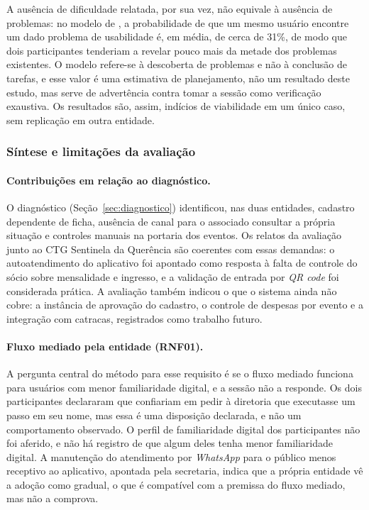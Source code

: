 \documentclass[12pt,a4paper]{article}
\begin{document}
A ausência de dificuldade relatada, por sua vez, não equivale
à ausência de problemas: no modelo de \textcite{nielsenlandauer1993}, a probabilidade de que um
mesmo usuário encontre um dado problema de usabilidade é, em média, de cerca de 31\%, de modo que
dois participantes tenderiam a revelar pouco mais da metade dos problemas existentes. O modelo
refere-se à descoberta de problemas e não à conclusão de tarefas, e esse valor é uma estimativa de
planejamento, não um resultado deste estudo, mas serve de advertência contra tomar a sessão como
verificação exaustiva. Os resultados são, assim, indícios de viabilidade em um único caso, sem
replicação em outra entidade.

\subsubsection{Síntese e limitações da avaliação}
\label{sec:sintese-avaliacao}

\paragraph{Contribuições em relação ao diagnóstico.} O diagnóstico (Seção~\ref{sec:diagnostico})
identificou, nas duas entidades, cadastro dependente de ficha, ausência de canal para o
associado consultar a própria situação e controles manuais na portaria dos eventos. Os relatos da
avaliação junto ao CTG Sentinela da Querência são coerentes com essas demandas: o autoatendimento do
aplicativo foi apontado como resposta à falta de controle do sócio sobre mensalidade e ingresso, e a
validação de entrada por \textit{QR code} foi considerada prática. A avaliação também indicou o que o
sistema ainda não cobre: a instância de aprovação do cadastro, o
controle de despesas por evento e a integração com catracas, registrados como trabalho futuro.

\paragraph{Fluxo mediado pela entidade (RNF01).} A pergunta central do método para esse requisito é se
o fluxo mediado funciona para usuários com menor familiaridade digital, e a sessão não a responde.
Os dois participantes declararam que confiariam em pedir à diretoria que executasse um passo em seu
nome, mas essa é uma disposição declarada, e não um comportamento observado. O perfil de
familiaridade digital dos participantes não foi aferido, e não há registro de que algum deles tenha
menor familiaridade digital. A manutenção do
atendimento por \textit{WhatsApp} para o público menos receptivo ao aplicativo, apontada pela
secretaria, indica que a própria entidade vê a adoção como gradual, o que é compatível com a premissa
do fluxo mediado, mas não a comprova.
\end{document}
